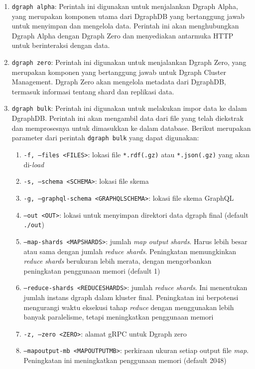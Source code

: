 \begin{enumerate}
    \item \texttt{dgraph alpha}: Perintah ini digunakan untuk menjalankan Dgraph Alpha, yang merupakan komponen utama dari DgraphDB yang bertanggung jawab untuk menyimpan dan mengelola data. Perintah ini akan menghubungkan Dgraph Alpha dengan Dgraph Zero dan menyediakan antarmuka HTTP untuk berinteraksi dengan data.
    \item \texttt{dgraph zero}: Perintah ini digunakan untuk menjalankan Dgraph Zero, yang merupakan komponen yang bertanggung jawab untuk Dgraph Cluster Management. Dgraph Zero akan mengelola metadata dari DgraphDB, termasuk informasi tentang shard dan replikasi data.
    \item \texttt{dgraph bulk}: Perintah ini digunakan untuk melakukan impor data ke dalam DgraphDB. Perintah ini akan mengambil data dari file yang telah diekstrak dan memprosesnya untuk dimasukkan ke dalam database. Berikut merupakan parameter dari perintah \texttt{dgraph bulk} yang dapat digunakan:
    \begin{enumerate}
        \item \texttt{-f, --files <FILES>}: lokasi file \texttt{*.rdf(.gz)} atau \texttt{*.json(.gz)} yang akan di-\textit{load}
        \item \texttt{-s, --schema <SCHEMA>}: lokasi file skema
        \item \texttt{-g, --graphql-schema <GRAPHQL\textunderscore SCHEMA>}: lokasi file skema GraphQL
        \item \texttt{--out <OUT>}: lokasi untuk menyimpan direktori data dgraph final (default \texttt{./out})
        \item \texttt{--map-shards <MAP\textunderscore SHARDS>}: jumlah \textit{map output shards}. Harus lebih besar atau sama dengan jumlah \textit{reduce shards}. Peningkatan memungkinkan \textit{reduce shards} berukuran lebih merata, dengan mengorbankan peningkatan penggunaan memori (default 1)
        \item \texttt{--reduce-shards <REDUCE\textunderscore SHARDS>}: jumlah \textit{reduce shards}. Ini menentukan jumlah instans dgraph dalam kluster final. Peningkatan ini berpotensi mengurangi waktu eksekusi tahap \textit{reduce} dengan menggunakan lebih banyak paralelisme, tetapi meningkatkan penggunaan memori
        \item \texttt{-z, --zero <ZERO>}: alamat gRPC untuk Dgraph zero
        \item \texttt{--mapoutput-mb <MAPOUTPUT\textunderscore MB>}: perkiraan ukuran setiap output file \textit{map}. Peningkatan ini meningkatkan penggunaan memori (default 2048)

\end{enumerate}
\end{enumerate}
